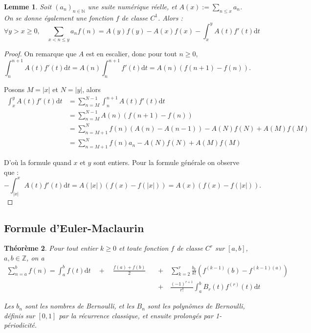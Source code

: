 \documentclass[french]{report}
\newtheorem{theorem}{Théorème}[section]
\newtheorem{lemma}[theorem]{Lemme}
\begin{document}
\begin{lemma}\label{lem:formule-abel}
  Soit $(a_n)_{n\in\mathbb{N}}$ une suite numérique réelle, et $A(x):=\sum_{n\leq x}a_n$. On se donne également une fonction $f$ de classe $C^1$. Alors :
  \[ \forall y>x\geq0,\quad
  \sum_{x<n\leq y} a_n f(n)
  = A(y)f(y) - A(x)f(x)
  - \int_x^yA(t)f'(t)\mathrm{d}t
  \]
\end{lemma}

\begin{proof}
  On remarque que $A$ est en escalier, donc pour tout $n\geq0$,
  \[ \int_n^{n+1}A(t)f'(t)\mathrm{d}t
  = A(n)\int_n^{n+1}f'(t)\mathrm{d}t
  = A(n)(f(n+1)-f(n)).
  \]

  Posons $M=|x|$ et $N=|y|$, alors
  \begin{align*}
    \int_x^yA(t)f'(t)\mathrm{d}t
    &= \sum_{n=M}^{N-1}\int_n^{n+1}A(t)f'(t)\mathrm{d}t \\
    &= \sum_{n=M}^{N-1}A(n)(f(n+1)-f(n)) \\
    &= \sum_{n=M+1}^Nf(n)(A(n)-A(n-1))-A(N)f(N)+A(M)f(M) \\
    &= \sum_{n=M+1}^Nf(n)a_n-A(N)f(N)+A(M)f(M)
  \end{align*}

  D'où la formule quand $x$ et $y$ sont entiers. Pour la formule générale on observe que :
  \[ -\int_{|x|}^xA(t)f'(t)\mathrm{d}t = A(|x|)(f(x)-f(|x|)) = A(x)(f(x)-f(|x|)). \]
  
\end{proof}

\subsection{Formule d'Euler-Maclaurin}

\begin{theorem}\label{eq:euler-maclaurin}
  Pour tout entier $k\geq0$ et toute fonction $f$ de classe $C^r$ sur $[a,b]$, $a,b\in\mathbb{Z}$, on a
  \begin{align*}
    \sum_{n=a}^b f(n) = \int_a^b f(t)\mathrm{d}t \quad + \quad \frac{f(a) + f(b)}{2} \quad &+ \quad \sum_{k=2}^r\frac{b_{k}}{k!}(f^{(k-1)}(b) - f^{(k-1)(a)}) \\
    &+ \quad \frac{(-1)^{r+1}}{r!}\int_a^b B_r(t)f^{(r)}(t)\mathrm{d}t
  \end{align*}

  Les $b_n$ sont les nombres de Bernoulli, et les $B_n$ sont les polynômes de Bernoulli, définis sur $[0,1]$ par la récurrence classique, et ensuite prolongés par 1-périodicité.
\end{theorem}
\end{document}
